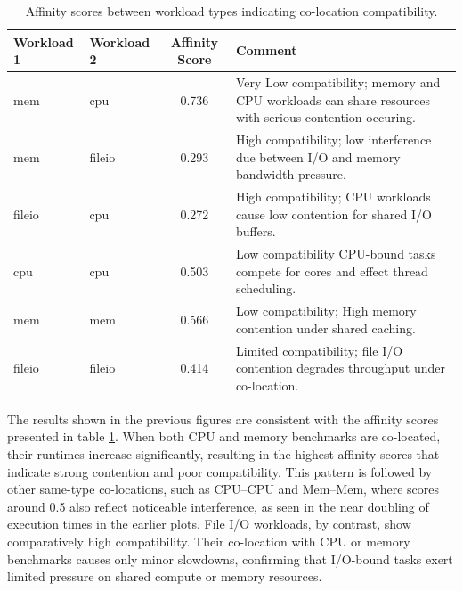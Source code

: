 \begin{table}[H]
    \centering
    \caption{Affinity scores between workload types indicating co-location compatibility.}
    \label{tab:affinity_scores}
    \begin{tabularx}{\textwidth}{l l c X}
        \toprule
        \textbf{Workload 1} & \textbf{Workload 2} & \textbf{Affinity Score} & \textbf{Comment}                                                                                       \\
        \midrule
        mem                 & cpu                 & 0.736                   & Very Low compatibility; memory and CPU workloads can share resources with serious contention occuring. \\
        mem                 & fileio              & 0.293                   & High compatibility; low interference due between I/O and memory bandwidth pressure.                    \\
        fileio              & cpu                 & 0.272                   & High compatibility; CPU workloads cause low contention for shared I/O buffers.                         \\
        cpu                 & cpu                 & 0.503                   & Low compatibility CPU-bound tasks compete for cores and effect thread scheduling.                      \\
        mem                 & mem                 & 0.566                   & Low compatibility; High memory contention under shared caching.                                        \\
        fileio              & fileio              & 0.414                   & Limited compatibility; file I/O contention degrades throughput under co-location.                      \\
        \bottomrule
    \end{tabularx}
\end{table}

The results shown in the previous figures are consistent with the affinity scores presented in table \ref{tab:affinity_scores}. When both CPU and memory benchmarks are co-located, their runtimes increase significantly, resulting in the highest affinity scores that indicate strong contention and poor compatibility. This pattern is followed by other same-type co-locations, such as CPU–CPU and Mem–Mem, where scores around 0.5 also reflect noticeable interference, as seen in the near doubling of execution times in the earlier plots. File I/O workloads, by contrast, show comparatively high compatibility. Their co-location with CPU or memory benchmarks causes only minor slowdowns, confirming that I/O-bound tasks exert limited pressure on shared compute or memory resources.

